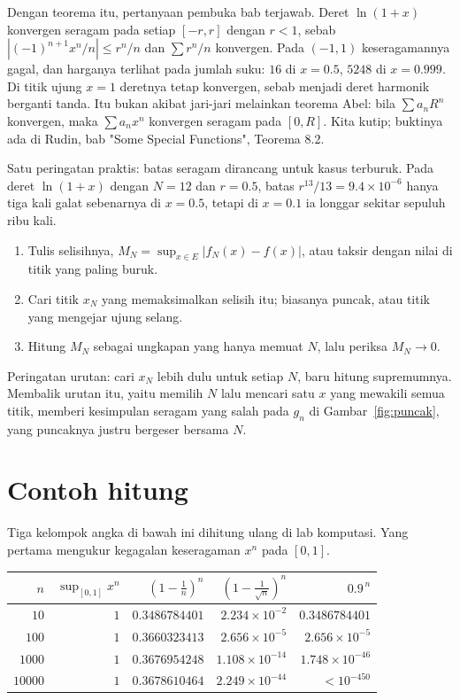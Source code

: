 Dengan teorema itu, pertanyaan pembuka bab terjawab. Deret $\ln(1+x)$ konvergen
seragam pada setiap $[-r,r]$ dengan $r<1$, sebab $|(-1)^{n+1}x^n/n|\le r^n/n$
dan $\sum r^n/n$ konvergen. Pada $(-1,1)$ keseragamannya gagal, dan harganya
terlihat pada jumlah suku: $16$ di $x=0.5$, $5248$ di $x=0.999$. Di titik ujung
$x=1$ deretnya tetap konvergen, sebab menjadi deret harmonik berganti tanda. Itu
bukan akibat jari-jari melainkan teorema Abel: bila $\sum a_nR^n$ konvergen,
maka $\sum a_nx^n$ konvergen seragam pada $[0,R]$. Kita kutip; buktinya ada di
Rudin, bab "Some Special Functions", Teorema 8.2.

Satu peringatan praktis: batas seragam dirancang untuk kasus terburuk. Pada
deret $\ln(1+x)$ dengan $N=12$ dan $r=0.5$, batas $r^{13}/13=9.4\times10^{-6}$
hanya tiga kali galat sebenarnya di $x=0.5$, tetapi di $x=0.1$ ia longgar sekitar
sepuluh ribu kali.

\begin{resep}
\begin{enumerate}
\item Tulis selisihnya, $M_N=\sup_{x\in E}|f_N(x)-f(x)|$, atau taksir dengan
      nilai di titik yang paling buruk.
\item Cari titik $x_N$ yang memaksimalkan selisih itu; biasanya puncak, atau
      titik yang mengejar ujung selang.
\item Hitung $M_N$ sebagai ungkapan yang hanya memuat $N$, lalu periksa
      $M_N\to0$.
\end{enumerate}
Peringatan urutan: cari $x_N$ lebih dulu untuk setiap $N$, baru hitung
supremumnya. Membalik urutan itu, yaitu memilih $N$ lalu mencari satu $x$ yang
mewakili semua titik, memberi kesimpulan seragam yang salah pada $g_n$ di
Gambar~\ref{fig:puncak}, yang puncaknya justru bergeser bersama $N$.
\end{resep}

\section{Contoh hitung}

Tiga kelompok angka di bawah ini dihitung ulang di lab komputasi. Yang pertama
mengukur kegagalan keseragaman $x^n$ pada $[0,1]$.

\begin{center}
\small
\begin{tabular}{rrrrr}
\hline
$n$ & $\sup_{[0,1]}x^n$ & $(1-\tfrac1n)^n$ & $(1-\tfrac1{\sqrt n})^n$ & $0.9^{\,n}$\\
\hline
$10$    & $1$ & $0.3486784401$ & $2.234\times10^{-2}$ & $0.3486784401$\\
$100$   & $1$ & $0.3660323413$ & $2.656\times10^{-5}$ & $2.656\times10^{-5}$\\
$1000$  & $1$ & $0.3676954248$ & $1.108\times10^{-14}$ & $1.748\times10^{-46}$\\
$10000$ & $1$ & $0.3678610464$ & $2.249\times10^{-44}$ & $<10^{-450}$\\
\hline
\end{tabular}
\end{center}

